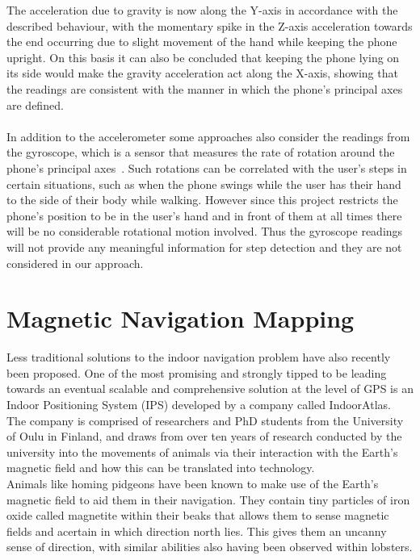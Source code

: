 \documentclass[main.tex]{subfiles}
\begin{document}
The acceleration due to gravity is now along the Y-axis in accordance with the described behaviour, with the momentary spike in the Z-axis acceleration towards the end occurring due to slight movement of the hand while keeping the phone upright. On this basis it can also be concluded that keeping the phone lying on its side would make the gravity acceleration act along the X-axis, showing that the readings are consistent with the manner in which the phone's principal axes are defined. 
\\
\\
In addition to the accelerometer some approaches also consider the readings from the gyroscope, which is a sensor that measures the rate of rotation around the phone's principal axes~\cite{accelerometerAcceleration}. Such rotations can be correlated with the user's steps in certain situations, such as when the phone swings while the user has their hand to the side of their body while walking. However since this project restricts the phone's position to be in the user's hand and in front of them at all times there will be no considerable rotational motion involved. Thus the gyroscope readings will not provide any meaningful information for step detection and they are not considered in our approach. 

 \section*{Magnetic Navigation Mapping}
 
 Less traditional solutions to the indoor navigation problem have also recently been proposed. One of the most promising and strongly tipped to be leading towards an eventual scalable and comprehensive solution at the level of GPS is an Indoor Positioning System (IPS) developed by a company called IndoorAtlas. The company is comprised of researchers and PhD students from the University of Oulu in Finland, and draws from over ten years of research conducted by the university into the movements of animals via their interaction with the Earth's magnetic field and how this can be translated into technology.\\
 
 Animals like homing pidgeons have been known to make use of the Earth's magnetic field to aid them in their navigation. They contain tiny particles of iron oxide called magnetite within their beaks that allows them to sense magnetic fields and acertain in which direction north lies. This gives them an uncanny sense of direction, with similar abilities also having been observed within lobsters. \\
 
\end{document}
